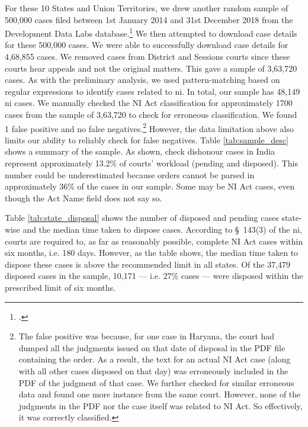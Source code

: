 For these 10 States and Union Territories, we drew another random sample of 500,000 cases filed between 1st January 2014 and 31st December 2018 from the Development Data Labs database.\footcite{devdatalabs2021_eCourtsData} We then attempted to download case details for these 500,000 cases. We were able to successfully download case details for 4,68,855 cases. We removed cases from District and Sessions courts since these courts hear appeals and not the original matters. This gave a sample of 3,63,720 cases. As with the preliminary analysis, we used pattern-matching based on regular expressions to identify cases related to \gls{ni}. In total, our sample has 48,149 \gls{ni} cases. We manually checked the NI Act classification for approximately 1700 cases from the sample of 3,63,720 to check for erroneous classification. We found 1 false positive and no false negatives.\footnote{The false positive was because, for one case in Haryana, the court had dumped all the judgments issued on that date of disposal in the PDF file containing the order. As a result, the text for an actual NI Act case (along with all other cases disposed on that day) was erroneously included in the PDF of the judgment of that case. We further checked for similar erroneous data and found one more instance from the same court. However, none of the judgments in the PDF nor the case itself was related to NI Act. So effectively, it was correctly classified.} However, the data limitation above also limits our ability to reliably check for false negatives. Table \ref{tab:sample_desc} shows a summary of the sample. As shown, check dishonour cases in India represent approximately 13.2\% of courts' workload (pending and disposed). This number could be underestimated because orders cannot be parsed in approximately 36\% of the cases in our sample. Some may be NI Act cases, even though the Act Name field does not say so.

Table \ref{tab:state_disposal} shows the number of disposed and pending cases state-wise and the median time taken to dispose cases. According to \S~143(3) of the \gls{ni}, courts are required to, as far as reasonably possible, complete NI Act cases within six months, i.e. 180 days. However, as the table shows, the median time taken to dispose these cases is above the recommended limit in all states. Of the 37,479 disposed cases in the sample, 10,171 --- i.e. 27\% cases --- were disposed within the prescribed limit of six months.

